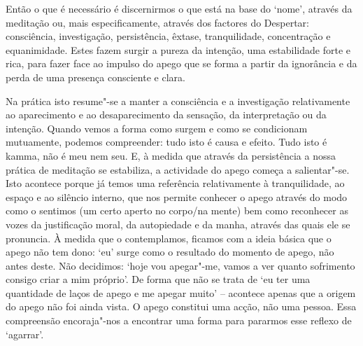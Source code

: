 Então o que é necessário é discernirmos o que está na base do `nome', através da
meditação ou, mais especificamente, através dos factores do Despertar:
consciência, investigação, persistência, êxtase, tranquilidade, concentração e
equanimidade. Estes fazem surgir a pureza da intenção, uma estabilidade forte e
rica, para fazer face ao impulso do apego que se forma a partir da ignorância e
da perda de uma presença consciente e clara.

Na prática isto resume"-se a manter a consciência e a investigação relativamente
ao aparecimento e ao desaparecimento da sensação, da interpretação ou da
intenção. Quando vemos a forma como surgem e como se condicionam mutuamente,
podemos compreender: tudo isto é causa e efeito. Tudo isto é kamma, não é meu
nem seu. E, à medida que através da persistência a nossa prática de meditação se
estabiliza, a actividade do apego começa a salientar"-se. Isto acontece porque
já temos uma referência relativamente à tranquilidade, ao espaço e ao silêncio
interno, que nos permite conhecer o apego através do modo como o sentimos (um
certo aperto no corpo/na mente) bem como reconhecer as vozes da justificação
moral, da autopiedade e da manha, através das quais ele se pronuncia. À medida
que o contemplamos, ficamos com a ideia básica que o apego não tem dono: `eu'
surge como o resultado do momento de apego, não antes deste. Não decidimos:
`hoje vou apegar"-me, vamos a ver quanto sofrimento consigo criar a mim
próprio'. De forma que não se trata de `eu ter uma quantidade de laços de apego
e me apegar muito' -- acontece apenas que a origem do apego não foi ainda vista.
O apego constitui uma acção, não uma pessoa. Essa compreensão encoraja"-nos a
encontrar uma forma para pararmos esse reflexo de `agarrar'.

\enlargethispage{\baselineskip}

